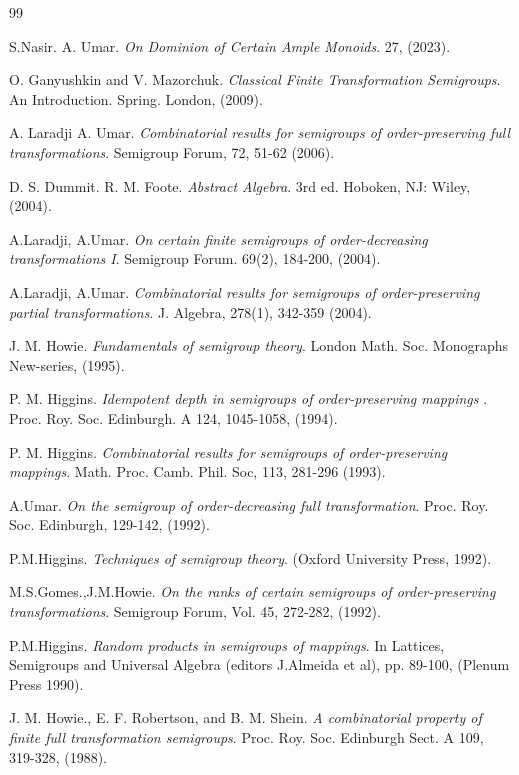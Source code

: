 \documentclass[10pt]{extarticle}
\numberwithin{equation}{section}
\numberwithin{bbb}{section}
\numberwithin{equation}{section}
\begin{document}
\begin{thebibliography}{99}

 S.Nasir. A. Umar. \textit{On Dominion of Certain Ample Monoids}. 27, (2023).

 O. Ganyushkin and V. Mazorchuk.
\textit{Classical Finite Transformation Semigroups}. An Introduction. Spring. London, (2009).

 A. Laradji A. Umar. \textit{Combinatorial results for semigroups of order-preserving full transformations}. Semigroup Forum, 72, 51-62 (2006).

 D. S. Dummit. R. M. Foote. \textit{Abstract Algebra}. 3rd ed. Hoboken, NJ: Wiley, (2004).

  A.Laradji, A.Umar. \textit{On certain finite semigroups of order-decreasing transformations I}. Semigroup Forum. 69(2), 184-200, (2004).  

  A.Laradji, A.Umar. \textit{Combinatorial results for semigroups of order-preserving partial transformations}. J. Algebra, 278(1), 342-359 (2004).
       
  J. M. Howie. \textit{Fundamentals of semigroup theory}. London Math. Soc. Monographs New-series, (1995).

  P. M. Higgins. \textit{Idempotent depth in semigroups of order-preserving mappings }. Proc. Roy. Soc. Edinburgh. A 124, 1045-1058, (1994).

  P. M. Higgins. \textit{Combinatorial results for semigroups of order-preserving mappings}. Math. Proc. Camb. Phil. Soc, 113, 281-296 (1993).
 
  A.Umar. \textit{On the semigroup of order-decreasing full transformation}. Proc. Roy. Soc. Edinburgh, 129-142, (1992).

   P.M.Higgins. \textit{Techniques of semigroup theory}. (Oxford University Press, 1992).

   M.S.Gomes.,J.M.Howie. \textit{On the ranks of certain semigroups of order-preserving transformations}. Semigroup Forum, Vol. 45, 272-282, (1992).


 P.M.Higgins. \textit{Random products in semigroups of mappings}. In Lattices, Semigroups and Universal Algebra (editors J.Almeida et al), pp. 89-100, (Plenum Press 1990).

 J. M. Howie., E. F. Robertson, and B. M. Shein. \textit{A combinatorial property of finite full transformation semigroups}. Proc. Roy. Soc. Edinburgh Sect. A 109, 319-328, (1988).



\end{thebibliography}
\end{document}
